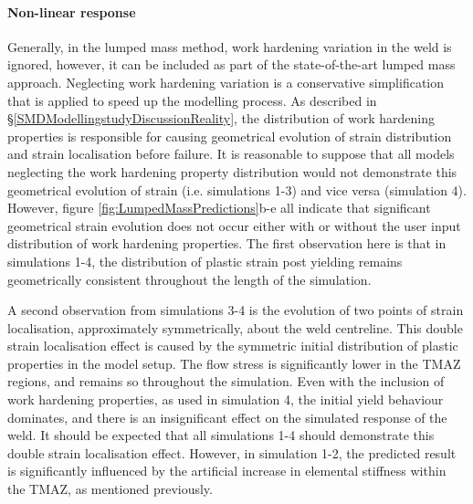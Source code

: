 \paragraph{Non-linear response} 
\label{SMDModellingstudyResultsSims1to4Correction1Plasticity}
Generally, in the lumped mass method, work hardening variation in the weld is ignored, however, it can be included as part of the state-of-the-art lumped mass approach. Neglecting work hardening variation is a conservative simplification that is applied to speed up the modelling process. As described in \S\ref{SMDModellingstudyDiscussionReality}, the distribution of work hardening properties is responsible for causing geometrical evolution of strain distribution and strain localisation before failure. It is reasonable to suppose that all models neglecting the work hardening property distribution would not demonstrate this geometrical evolution of strain (i.e. simulations 1-3) and vice versa (simulation 4). However, figure \ref{fig:LumpedMassPredictions}b-e all indicate that significant geometrical strain evolution does not occur either with or without the user input distribution of work hardening properties. The first observation here is that in simulations 1-4, the distribution of plastic strain post yielding remains geometrically consistent throughout the length of the simulation. 

A second observation from simulations 3-4 is the evolution of two points of strain localisation, approximately symmetrically, about the weld centreline. This double strain localisation effect is caused by the symmetric initial distribution of plastic properties in the model setup. The flow stress is significantly lower in the TMAZ regions, and remains so throughout the simulation. Even with the inclusion of work hardening properties, as used in simulation 4, the initial yield behaviour dominates, and there is an insignificant effect on the simulated response of the weld. It should be expected that all simulations 1-4 should demonstrate this double strain localisation effect. However, in simulation 1-2, the predicted result is significantly influenced by the artificial increase in elemental stiffness within the TMAZ, as mentioned previously.

